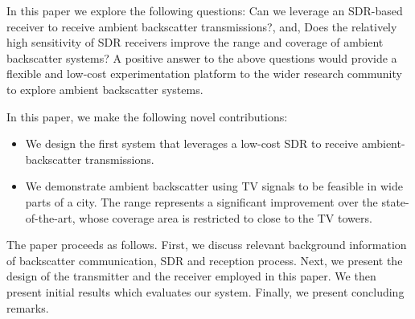 In this paper we explore the following questions: Can we leverage an
SDR-based receiver to receive ambient backscatter transmissions?, and, Does the  
relatively high sensitivity of SDR receivers improve the
range and coverage of ambient backscatter systems? A positive answer to the above questions would provide a
flexible and low-cost experimentation platform to the wider research community to explore ambient backscatter
systems.

  In this paper, we make the following novel contributions:

\begin{itemize}
		

				\item We design the first system that leverages a  low-cost 
					  SDR to receive ambient-backscatter transmissions. 
				\item  We demonstrate ambient backscatter using TV signals
					   to be feasible in wide parts of a city. The range represents a significant improvement
					   over the state-of-the-art, whose coverage area 
					   is  restricted to close to the TV towers.
				
\end{itemize}

The paper proceeds as follows. First, we discuss relevant background information of backscatter communication,
SDR and reception process. Next, we present the design of the transmitter and the receiver employed in this
paper. We then present initial results which evaluates our system. Finally, we present concluding remarks.

